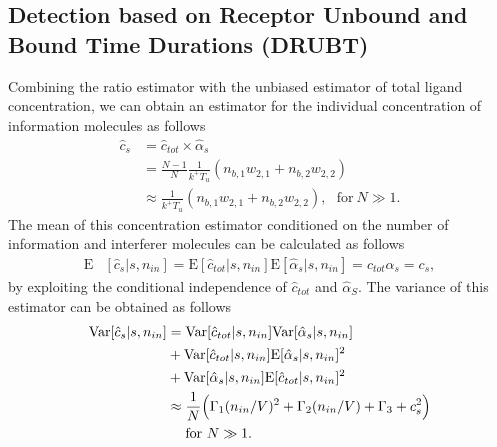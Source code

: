 \documentclass[twocolumn]{IEEEtran}
\newcommand{\E}{\mathrm{E}}
\newcommand{\Var}{\mathrm{Var}}
\begin{document}
\subsection{Detection based on Receptor Unbound and Bound Time Durations (DRUBT)}
Combining the ratio estimator with the unbiased estimator of total ligand concentration, we can obtain an estimator for the individual concentration of information molecules as follows 
\begin{align} \label{eq:csestimator}
\hat{c}_s &= \hat{c}_{tot} \times \hat{\alpha}_s \\ \nonumber
&= \frac{N-1}{N} \frac{1}{k^+ T_u}  \left( n_{b,1} w_{2,1} + n_{b,2} w_{2,2} \right) \\ \nonumber
&\approx \frac{1}{k^+ T_u}  \left( n_{b,1} w_{2,1} + n_{b,2} w_{2,2} \right), ~~~ \text{for}~ N \gg 1.
\end{align}
The mean of this concentration estimator conditioned on the number of information and interferer molecules can be calculated as follows
\begin{align}
\E&[\hat{c}_s|s, n_{in}] = \E[\hat{c}_{tot}|s, n_{in}] \E[\hat{\alpha}_s|s, n_{in} ] = c_{tot} \alpha_s = c_s,
\end{align}
by exploiting the conditional independence of $\hat{c}_{tot}$ and $\hat{\alpha}_S$. The variance of this estimator can be obtained as follows
\begin{align} \label{eq:totalvarianceunbiased}
\Var[\hat{c}_s|s, n_{in}] &=\Var[\hat{c}_{tot}|s, n_{in}] \Var[\hat{\alpha}_s|s, n_{in}] \\ \nonumber
&+ \Var[\hat{c}_{tot}|s, n_{in}] \E[\hat{\alpha}_s|s, n_{in}]^2  \\ \nonumber
&+ \Var[\hat{\alpha}_s|s, n_{in}] \E[\hat{c}_{tot}|s, n_{in}]^2 \\ \nonumber
& \approx \frac{1}{N} \Bigl(\Gamma_1 (n_{in}/V)^2 + \Gamma_2 (n_{in}/V) + \Gamma_3 + c_s^2\Bigr) \\ \nonumber
& \text{~~~~for~} N \gg 1.  
\end{align}
\end{document}
